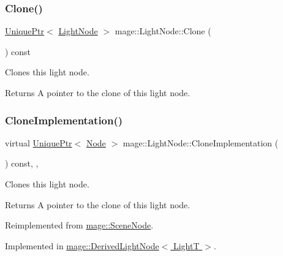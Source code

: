 \subsubsection{\texorpdfstring{Clone()}{Clone()}}
{\footnotesize\ttfamily \hyperlink{namespacemage_a3316d7143a973e37adf1110f2e80ca31}{Unique\+Ptr}$<$ \hyperlink{classmage_1_1_light_node}{Light\+Node} $>$ mage\+::\+Light\+Node\+::\+Clone (\begin{DoxyParamCaption}{ }\end{DoxyParamCaption}) const}

Clones this light node.

\begin{DoxyReturn}{Returns}
A pointer to the clone of this light node. 
\end{DoxyReturn}
\hypertarget{classmage_1_1_light_node_aea97601d0a4b8073a1c655ca334af242}{}\label{classmage_1_1_light_node_aea97601d0a4b8073a1c655ca334af242} 
\subsubsection{\texorpdfstring{Clone\+Implementation()}{CloneImplementation()}}
{\footnotesize\ttfamily virtual \hyperlink{namespacemage_a3316d7143a973e37adf1110f2e80ca31}{Unique\+Ptr}$<$ \hyperlink{classmage_1_1_node}{Node} $>$ mage\+::\+Light\+Node\+::\+Clone\+Implementation (\begin{DoxyParamCaption}{ }\end{DoxyParamCaption}) const\hspace{0.3cm}{\ttfamily [override]}, {\ttfamily [private]}, {}}

Clones this light node.

\begin{DoxyReturn}{Returns}
A pointer to the clone of this light node. 
\end{DoxyReturn}


Reimplemented from \hyperlink{classmage_1_1_scene_node_a42d0d53ab804d38ebd584d2de6490eeb}{mage\+::\+Scene\+Node}.



Implemented in \hyperlink{classmage_1_1_derived_light_node_acf8858989780bf45a45c55a7c5564314}{mage\+::\+Derived\+Light\+Node$<$ Light\+T $>$}.

\hypertarget{classmage_1_1_light_node_a2b971e64ec2267d49c2ba96a00662d3b}{}\label{classmage_1_1_light_node_a2b971e64ec2267d49c2ba96a00662d3b} 
